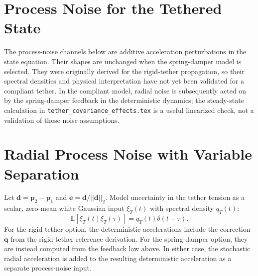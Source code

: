\documentclass[]{article}
\newcommand{\norm}[1]{\left| \left| #1 \right| \right|_{2}}
\begin{document}
\section{Process Noise for the Tethered State}

The process-noise channels below are additive acceleration perturbations in
the state equation. Their shapes are unchanged when the spring-damper model is
selected. They were originally derived for the rigid-tether propagation, so
their spectral densities and physical interpretation have not yet been
validated for a compliant tether. In the compliant model, radial noise is
subsequently acted on by the spring-damper feedback in the deterministic
dynamics; the steady-state calculation in
\texttt{tether\_covariance\_effects.tex} is a useful linearized check, not a
validation of those noise assumptions.

\section{Radial Process Noise with Variable Separation}

Let $\mathbf{d}=\mathbf{p}_2-\mathbf{p}_1$ and
$\mathbf{e}=\mathbf{d}/\norm{\mathbf{d}}$. Model uncertainty in the tether
tension as a scalar, zero-mean white Gaussian input $\xi_T(t)$ with spectral
density $q_T(t)$:
\begin{equation}
  \mathbb{E}\!\left[\xi_T(t)\xi_T(\tau)\right]
  =q_T(t)\delta(t-\tau).
\end{equation}
For the rigid-tether option, the deterministic accelerations include the
correction $\mathbf{q}$ from the rigid-tether reference derivation. For the
spring-damper option, they are instead computed from the feedback law above.
In either case, the stochastic radial acceleration is added to the resulting
deterministic acceleration as a separate process-noise input.
\end{document}

